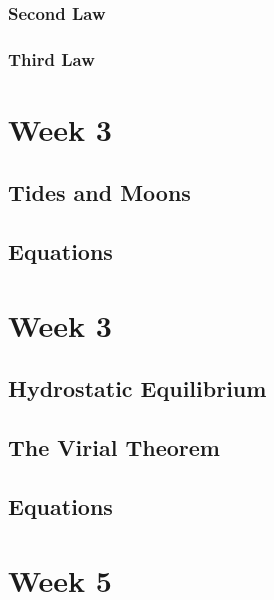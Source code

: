 \documentclass[a4paper,10pt]{article}
\begin{document}
\subsubsection{Second Law}
\subsubsection{Third Law}


\newpage
\section{Week 3}

\subsection{Tides and Moons}

\subsection{Equations}


\newpage
\section{Week 3}

\subsection{Hydrostatic Equilibrium}

\subsection{The Virial Theorem}

\subsection{Equations}



\newpage
\section{Week 5}
\end{document}
